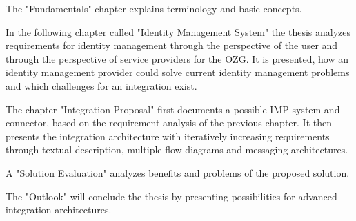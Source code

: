 The "Fundamentals" chapter explains terminology and basic concepts.

In the following chapter called "Identity Management System" the thesis analyzes requirements for identity management through the perspective of the user and through the perspective of service providers for the OZG. It is presented, how an identity management provider could solve current identity management problems and which challenges for an integration exist.

The chapter "Integration Proposal" first documents a possible IMP system and connector, based on the requirement analysis of the previous chapter. It then presents the integration architecture with iteratively increasing requirements through textual description, multiple flow diagrams and messaging architectures.

A "Solution Evaluation" analyzes benefits and problems of the proposed solution.

The "Outlook" will conclude the thesis by presenting possibilities for advanced integration architectures.